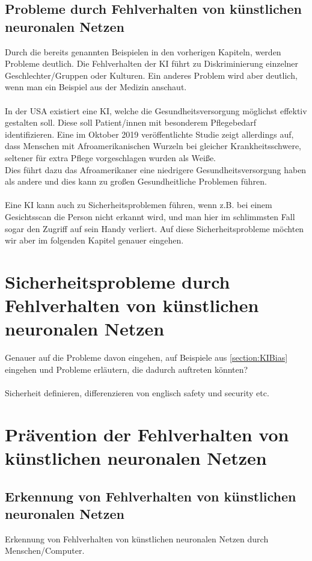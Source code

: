 \documentclass[12pt,oneside,a4paper,parskip]{scrbook}
\begin{document}
\section{Probleme durch Fehlverhalten von künstlichen neuronalen Netzen}
Durch die bereits genannten Beispielen in den vorherigen Kapiteln, werden Probleme deutlich. Die Fehlverhalten der KI führt zu Diskriminierung einzelner Geschlechter/Gruppen oder Kulturen. Ein anderes Problem wird aber deutlich, wenn man ein Beispiel aus der Medizin anschaut.
\\\\
In der USA existiert eine KI, welche die Gesundheitsversorgung möglichst effektiv gestalten soll. Diese soll Patient/innen mit besonderem Pflegebedarf identifizieren. Eine im Oktober 2019 veröffentlichte Studie zeigt allerdings auf, dass Menschen mit Afroamerikanischen Wurzeln bei gleicher Krankheitsschwere, seltener für extra Pflege vorgeschlagen wurden als Weiße\cite{Gesundheitsversorgung}. \\
Dies führt dazu das Afroamerikaner eine niedrigere Gesundheitsversorgung haben als andere und dies kann zu großen Gesundheitliche Problemen führen.
\\\\
Eine KI kann auch zu Sicherheitsproblemen führen, wenn z.B. bei einem Gesichtsscan die Person nicht erkannt wird, und man hier im schlimmsten Fall sogar den Zugriff auf sein Handy verliert. Auf diese Sicherheitsprobleme möchten wir aber im folgenden Kapitel genauer eingehen.

\chapter{Sicherheitsprobleme durch Fehlverhalten von künstlichen neuronalen Netzen}
Genauer auf die Probleme davon eingehen, auf Beispiele aus \ref{section:KIBias} eingehen und Probleme erläutern, die dadurch auftreten könnten? \\\\
Sicherheit definieren, differenzieren von englisch safety und security etc.

\chapter{Prävention der Fehlverhalten von künstlichen neuronalen Netzen}
\label{chapter:main}
\section{Erkennung von Fehlverhalten von künstlichen neuronalen Netzen}
Erkennung von Fehlverhalten von künstlichen neuronalen Netzen durch Menschen/Computer.
\end{document}
